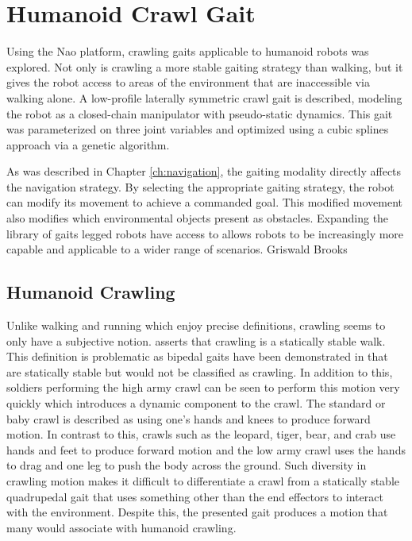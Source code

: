 
\chapter{Humanoid Crawl Gait} \label{ch:crawl_gait}

Using the Nao platform, crawling gaits applicable to humanoid robots was explored. 
Not only is crawling a more stable gaiting strategy than walking, but it gives the robot access to areas
of the environment that are inaccessible via walking alone. A low-profile laterally symmetric crawl gait is described, 
modeling the robot as a closed-chain manipulator with pseudo-static dynamics. This gait was parameterized on 
three joint variables and optimized using a cubic splines approach via a genetic algorithm.

As was described in Chapter \ref{ch:navigation}, the gaiting modality directly affects the navigation strategy.
By selecting the appropriate gaiting strategy, the robot can modify its movement to achieve a commanded goal.
This modified movement also modifies which environmental objects present as obstacles.
Expanding the library of gaits legged robots have access to allows robots to be increasingly more capable
and applicable to a wider range of scenarios.
Griswald Brooks
\section{Humanoid Crawling}

Unlike walking and running which enjoy precise definitions, crawling seems to only have a subjective notion.
\cite{Dudek2000} asserts that crawling is a statically stable walk. This definition is problematic
as bipedal gaits have been demonstrated in \cite{figureoutacitation} that are statically stable but would not
be classified as crawling. In addition to this, soldiers performing the high army crawl \cite{armyfieldmanual2008} can be seen to
perform this motion very quickly which introduces a dynamic component to the crawl.
The standard or baby crawl is described as using one's hands and knees to produce forward motion.
In contrast to this, crawls such as the leopard, tiger, bear, and crab use hands and feet to produce
forward motion and the low army crawl uses the hands to drag and one leg to push the body across the ground.
Such diversity in crawling motion makes it difficult to differentiate a crawl from a statically stable
quadrupedal gait that uses something other than the end effectors to interact with the environment.
Despite this, the presented gait produces a motion that many would associate with humanoid crawling.

